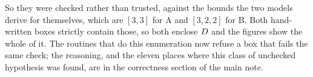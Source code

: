 \documentclass[11pt,a4paper]{article}
\begin{document}
So they were checked rather than trusted, against the bounds the two models
derive for themselves, which are $[3,3]$ for A and $[3,2,2]$ for B. Both
hand-written boxes strictly contain those, so both enclose $D$ and the
figures show the whole of it. The routines that do this enumeration now refuse
a box that fails the same check; the reasoning, and the eleven places where
this class of unchecked hypothesis was found, are in the correctness section of
the main note.
\end{document}
